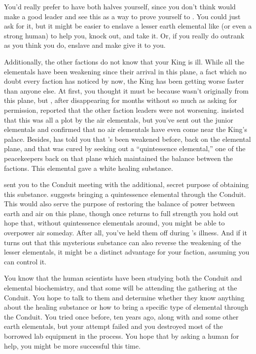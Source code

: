 \documentclass[char]{elementals}
\begin{document}
You'd really prefer to have both halves yourself, since you don't think \cRogue{} would make a good leader and see this as a way to prove yourself to \cEarthKing{}.  You could just ask \cRogue{} for it, but it might be easier to enslave a lesser earth elemental like \cMinion{} (or even a strong human) to help you, knock \cRogue{\them} out, and take it.  Or, if you really do outrank \cRogue{} as you think you do, enslave \cRogue{\them} and make \cRogue{\them} give it to you.

Additionally, the other factions do not know that your King is ill.  While all the elementals have been weakening since their arrival in this plane, a fact which no doubt every faction has noticed by now, the King has been getting worse faster than anyone else.  At first, you thought it must be because \cEarthKing{} wasn't originally from this plane, but \cRogue{}, after disappearing for months without so much as asking for permission, reported that the other faction leaders were not worsening.  \cRogue{\They} insisted that this was all a plot by the air elementals, but you've sent out the junior elementals and confirmed that no air elementals have even come near the King's palace.  Besides, \cEarthKing{} has told you that \cEarthKing{\they}'s been weakened before, back on the elemental plane, and that \cEarthKing{\they} was cured by seeking out a ``quintessence elemental,'' one of the peacekeepers back on that plane which maintained the balance between the factions.  This elemental gave \cEarthKing{\them} a white healing substance.  

\cEarthKing{} sent you to the Conduit meeting with the additional, secret purpose of obtaining this substance.  \cEarthKing{\They} suggests bringing a quintessence elemental through the Conduit.  This would also serve the purpose of restoring the balance of power between earth and air on this plane, though once \cEarthKing{} returns to full strength you hold out hope that, without quintessence elementals around, you might be able to overpower air someday.  After all, you've held them off during \cEarthKing{}'s illness.  And if it turns out that this mysterious substance can also reverse the weakening of the lesser elementals, it might be a distinct advantage for your faction, assuming you can control it.

You know that the human scientists have been studying both the Conduit and elemental biochemistry, and that some will be attending the gathering at the Conduit.  You hope to talk to them and determine whether they know anything about the healing substance or how to bring a specific type of elemental through the Conduit.  You tried once before, ten years ago, along with \cMinion{\intro} and some other earth elementals, but your attempt failed and you destroyed most of the borrowed lab equipment in the  process.  You hope that by asking a human for help, you might be more successful this time.
\end{document}
